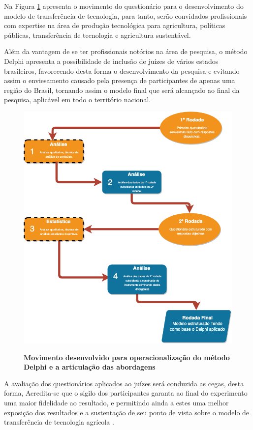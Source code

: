 Na Figura \ref{figura_delphi} apresenta o movimento do questionário para o desenvolvimento do modelo de transferência de tecnologia, para tanto, serão convidados profissionais com expertise na área de produção tecnológica para agricultura, políticas públicas, transferência de tecnologia e agricultura sustentável. 

Além da vantagem de se ter profissionais notórios na área de pesquisa, o método Delphi apresenta a  possibilidade de inclusão de juízes de vários estados brasileiros, favorecendo desta forma o desenvolvimento da pesquisa e evitando assim o enviesamento causado pela presença de participantes de apenas uma região do Brasil, tornando assim o modelo final que será alcançado ao final da pesquisa, aplicável em todo o território nacional.


\begin{figure}[H]
\centering
\caption{\textbf{Movimento desenvolvido para operacionalização do método Delphi e a articulação das
abordagens}}
\includegraphics[scale=0.3]{Imagens/delphi.png}
\label{figura_delphi}
\end{figure}


A avaliação dos questionários aplicados ao  juízes será conduzida as cegas, desta forma, Acredita-se que o sigilo dos participantes garanta ao final do experimento uma maior fidelidade ao resultado, e permitindo ainda a estes uma melhor exposição dos resultados e a sustentação de seu ponto de vista sobre o modelo de transferência de tecnologia agrícola \cite{keeney_delphi_2011}.








